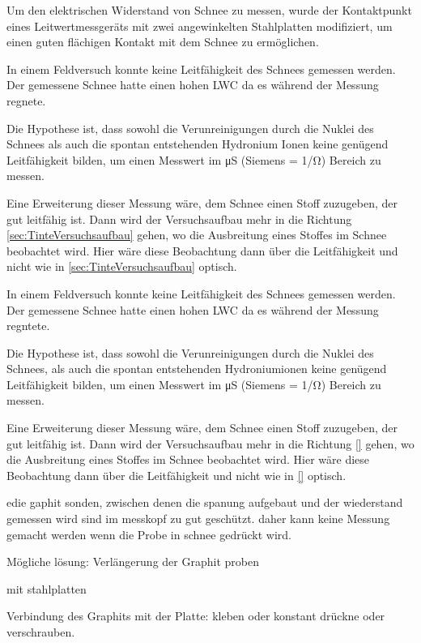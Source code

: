 Um den elektrischen Widerstand von Schnee zu messen, wurde der Kontaktpunkt eines Leitwertmessgeräts mit zwei angewinkelten Stahlplatten modifiziert, um einen guten flächigen Kontakt mit dem Schnee zu ermöglichen.

In einem Feldversuch konnte keine Leitfähigkeit des Schnees gemessen werden. Der gemessene Schnee hatte einen hohen LWC da es während der Messung regnete.


Die Hypothese ist, dass sowohl die Verunreinigungen durch die Nuklei des Schnees als auch die spontan entstehenden Hydronium Ionen keine genügend Leitfähigkeit bilden,  um einen Messwert im \si{\micro\siemens} (Siemens = \si{1/\ohm}) Bereich zu messen. \cite{Scholz.2020}

Eine Erweiterung dieser Messung wäre, dem Schnee einen Stoff zuzugeben, der gut leitfähig ist. Dann wird der Versuchsaufbau mehr in die Richtung \ref{sec:TinteVersuchsaufbau} gehen, wo die Ausbreitung eines Stoffes im Schnee beobachtet wird. Hier wäre diese Beobachtung dann über die Leitfähigkeit und nicht wie in \ref{sec:TinteVersuchsaufbau} optisch.



\iffalse
In einem Feldversuch konnte keine Leitfähigkeit des Schnees gemessen werden. Der gemessene Schnee hatte einen hohen LWC da es während der Messung regntete.


Die Hypothese ist, dass sowohl die Verunreinigungen durch die Nuklei des Schnees, als auch die spontan entstehenden Hydroniumionen  keine genügend Leitfähigkeit bilden,  um einen Messwert im \si{\micro\siemens} (Siemens = \si{1/\ohm}) Bereich zu messen.

Eine Erweiterung dieser Messung wäre, dem Schnee einen Stoff zuzugeben, der gut leitfähig ist. Dann wird der Versuchsaufbau mehr in die Richtung \ref{} gehen, wo die Ausbreitung eines Stoffes im Schnee beobachtet wird. Hier wäre diese Beobachtung dann über die Leitfähigkeit und nicht wie in \ref{} optisch.




edie gaphit sonden, zwischen denen die spanung aufgebaut und der wiederstand gemessen wird sind im messkopf zu gut geschützt. daher kann keine Messung gemacht werden wenn die Probe in schnee gedrückt wird.

Mögliche lösung: Verlängerung der Graphit proben

mit stahlplatten

Verbindung des Graphits mit der Platte: kleben oder konstant drückne oder verschrauben.

